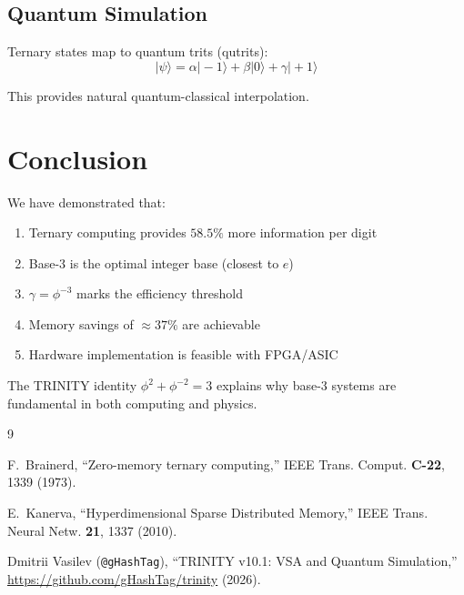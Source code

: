 \documentclass[12pt,a4paper]{article}
\begin{document}
\subsection{Quantum Simulation}

Ternary states map to quantum trits (qutrits):
\begin{equation}
|\psi\rangle = \alpha|-1\rangle + \beta|0\rangle + \gamma|+1\rangle
\end{equation}

This provides natural quantum-classical interpolation.

\section{Conclusion}

We have demonstrated that:
\begin{enumerate}
\item Ternary computing provides $58.5\%$ more information per digit
\item Base-3 is the optimal integer base (closest to $e$)
\item $\gamma = \phi^{-3}$ marks the efficiency threshold
\item Memory savings of $\approx 37\%$ are achievable
\item Hardware implementation is feasible with FPGA/ASIC
\end{enumerate}

The TRINITY identity $\phi^2 + \phi^{-2} = 3$ explains why base-3 systems are fundamental in both computing and physics.

\begin{thebibliography}{9}

F.~Brainerd,
``Zero-memory ternary computing,''
IEEE Trans. Comput. \textbf{C-22}, 1339 (1973).

E.~Kanerva,
``Hyperdimensional Sparse Distributed Memory,''
IEEE Trans. Neural Netw. \textbf{21}, 1337 (2010).

Dmitrii Vasilev (\texttt{@gHashTag}),
``TRINITY v10.1: VSA and Quantum Simulation,''
\url{https://github.com/gHashTag/trinity} (2026).

\end{thebibliography}
\end{document}
